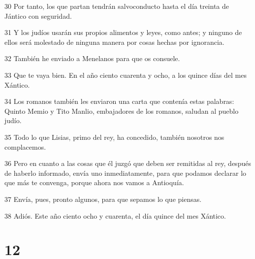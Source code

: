 \par 30 Por tanto, los que partan tendrán salvoconducto hasta el día treinta de Jántico con seguridad.
\par 31 Y los judíos usarán sus propios alimentos y leyes, como antes; y ninguno de ellos será molestado de ninguna manera por cosas hechas por ignorancia.
\par 32 También he enviado a Menelanos para que os consuele.
\par 33 Que te vaya bien. En el año ciento cuarenta y ocho, a los quince días del mes Xántico.
\par 34 Los romanos también les enviaron una carta que contenía estas palabras: Quinto Memio y Tito Manlio, embajadores de los romanos, saludan al pueblo judío.
\par 35 Todo lo que Lisias, primo del rey, ha concedido, también nosotros nos complacemos.
\par 36 Pero en cuanto a las cosas que él juzgó que deben ser remitidas al rey, después de haberlo informado, envía uno inmediatamente, para que podamos declarar lo que más te convenga, porque ahora nos vamos a Antioquía.
\par 37 Envía, pues, pronto algunos, para que sepamos lo que piensas.
\par 38 Adiós. Este año ciento ocho y cuarenta, el día quince del mes Xántico.

\chapter{12}

